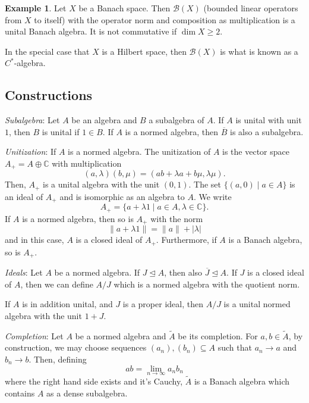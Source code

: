\documentclass[]{article}
\theoremstyle{definition}
\newtheorem{example}{Example}[section]
\begin{document}
\begin{example}
  Let \(X\) be a Banach space. Then \(\mathcal{B}(X)\) (bounded linear operators from \(X\) to itself)
  with the operator norm and composition as multiplication is a unital Banach algebra.
  It is not commutative if \(\dim X \ge 2\). 

  In the special case that \(X\) is a Hilbert space, then \(\mathcal{B}(X)\) is what is known as 
  a \(C^*\)-algebra.
\end{example}

\subsection{Constructions}

\textit{Subalgebra}: Let \(A\) be an algebra and \(B\) a subalgebra of \(A\). If \(A\) is unital with unit 
\(1\), then \(B\) is unital if \(1 \in B\). If \(A\) is a normed algebra, then \(\overline{B}\) 
is also a subalgebra.

\textit{Unitization}: If \(A\) is a normed algebra. The unitization of \(A\) is the vector space 
\(A_+ = A \oplus \mathbb{C}\) with multiplication 
\[(a, \lambda)(b, \mu) = (ab + \lambda a + b\mu, \lambda \mu).\]
Then, \(A_+\) is a unital algebra with the unit \((0, 1)\). The set \(\{(a, 0) \mid a \in A\}\) is 
an ideal of \(A_+\) and is isomorphic as an algebra to \(A\). We write 
\[A_+ = \{a + \lambda 1 \mid a \in A, \lambda \in \mathbb{C}\}.\]
If \(A\) is a normed algebra, then so is \(A_+\) with the norm 
\[\|a + \lambda 1\| = \|a\| + |\lambda|\]
and in this case, \(A\) is a closed ideal of \(A_+\). Furthermore, if \(A\) is a Banach algebra, 
so is \(A_+\).

\textit{Ideals}: Let \(A\) be a normed algebra. If \(J \trianglelefteq A\), then also 
\(\overline{J} \trianglelefteq A\). If \(J\) is a closed ideal of \(A\), then we can define \(A / J\) 
which is a normed algebra with the quotient norm. 

If \(A\) is in addition unital, and \(J\) is a proper ideal, then \(A / J\) is a unital normed algebra
with the unit \(1 + J\).

\textit{Completion}: Let \(A\) be a normed algebra and \(\tilde A\) be its completion. For \(a, b \in \tilde A\), 
by construction, we may choose sequences \((a_n), (b_n) \subseteq A\) such that \(a_n \to a\) and 
\(b_n \to b\). Then, defining 
\[ab = \lim_{n \to \infty} a_n b_n\]
where the right hand side exists and it's Cauchy, \(\tilde A\) is a Banach algebra which contains 
\(A\) as a dense subalgebra.
\end{document}
